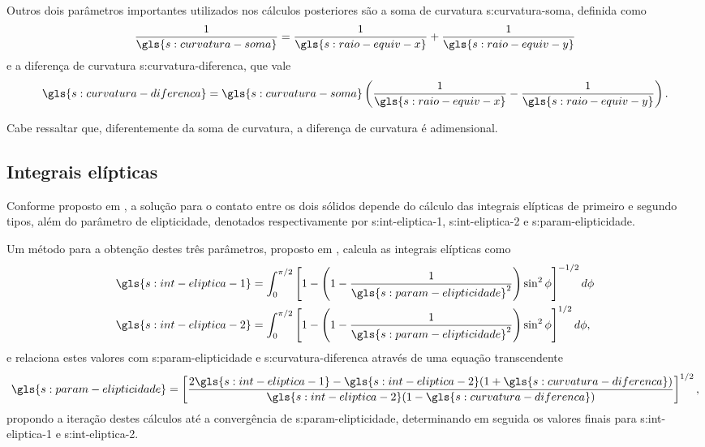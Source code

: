 \documentclass[12pt,oneside,english,brazil,lmodern,siglas,simbolos,cite=num]{ucsmonograph}
\begin{document}
	Outros dois parâmetros importantes utilizados nos cálculos posteriores são a soma de curvatura \gls{s:curvatura-soma}, definida como \cite{wijnant:1998}
	\begin{equation} \label{eqn:seco:curv-soma}
		\frac{1}{\gls{s:curvatura-soma}} =
		\frac{1}{\gls{s:raio-equiv-x}} + \frac{1}{\gls{s:raio-equiv-y}}
	\end{equation}
	e a diferença de curvatura \gls{s:curvatura-diferenca}, que vale
	\begin{equation} \label{eqn:seco:curv-diferenca}
		\gls{s:curvatura-diferenca} = \gls{s:curvatura-soma}
		\left( \frac{1}{\gls{s:raio-equiv-x}} - 
		\frac{1}{\gls{s:raio-equiv-y}} \right).
	\end{equation}
	
	Cabe ressaltar que, diferentemente da soma de curvatura, a diferença de curvatura é adimensional.
	
	\subsection{Integrais elípticas} \label{sec:int-elipticas}
	Conforme proposto em \cite{hertz:1881}, a solução para o contato entre os dois sólidos depende do cálculo das integrais elípticas de primeiro e segundo tipos, além do parâmetro de elipticidade, denotados respectivamente por \gls{s:int-eliptica-1}, \gls{s:int-eliptica-2} e \gls{s:param-elipticidade}.
	
	Um método para a obtenção destes três parâmetros, proposto em \cite{hamrock:1991}, calcula as integrais elípticas como
	\begin{align}
		\gls{s:int-eliptica-1} &= \int_{0}^{\pi/2} \left[ 1 - \left( 1-\frac{1}{\gls{s:param-elipticidade}^2}\right)\sin^2\phi
		\right]^{-1/2}d\phi \label{eqn:seco:int-elip-1} \\
		\gls{s:int-eliptica-2} &= \int_{0}^{\pi/2} \left[ 1 - \left(
		1-\frac{1}{\gls{s:param-elipticidade}^2}\right)\sin^2\phi
		\right]^{1/2}d\phi \label{eqn:seco:int-elip-2},
	\end{align}
	e relaciona estes valores com \gls{s:param-elipticidade} e \gls{s:curvatura-diferenca} através de uma equação transcendente
	\begin{equation} \label{eqn:seco:param-elip}
		\gls{s:param-elipticidade} = \left[ \frac{
		2\gls{s:int-eliptica-1} - \gls{s:int-eliptica-2}(
		1+\gls{s:curvatura-diferenca})}{
		\gls{s:int-eliptica-2}(1-\gls{s:curvatura-diferenca})}
		\right]^{1/2},
	\end{equation}
	propondo a iteração destes cálculos até a convergência de \gls{s:param-elipticidade}, determinando em seguida os valores finais para \gls{s:int-eliptica-1} e \gls{s:int-eliptica-2}.
	
\end{document}
